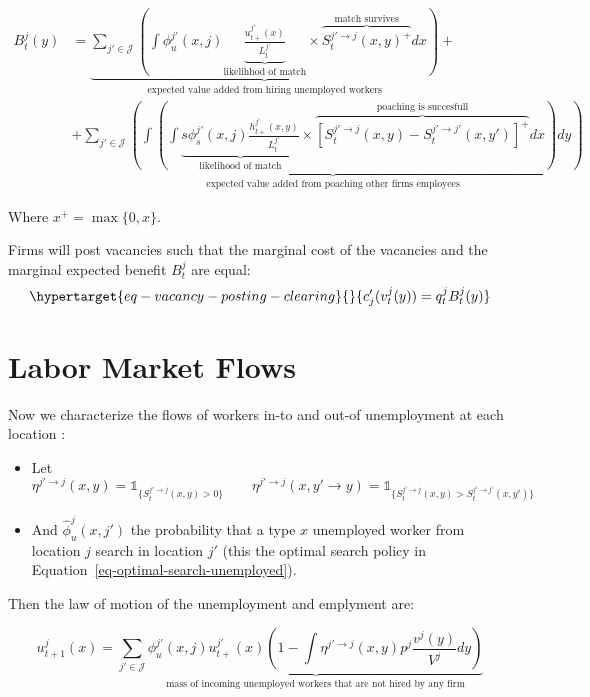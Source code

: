 \documentclass[
  letterpaper,
  DIV=11,
  numbers=noendperiod]{scrreprt}
\providecommand{\tightlist}{%
  \setlength{\itemsep}{0pt}\setlength{\parskip}{0pt}}\usepackage{longtable,booktabs,array}
\begin{document}
\begin{align}
B^j_t(y) &= \underbrace{\sum_{j'\in \mathcal{J}}\left( \int\phi_u^{j'}(x,j)\underbrace{\frac{u^{j'}_{t+}(x)}{L^{j'}_t}}_{\text{likelihhod of match}}\times\overbrace{  S_t^{j'\to j}(x,y)^{+} }^{\text{match survives}}dx\right)}_{\text{expected value added from hiring unemployed workers}} + \nonumber \\
& +\underbrace{\sum_{j'\in \mathcal{J}}\left(\int \left(\int\underbrace{s\phi_s^{j'}(x,j)\frac{h^{j'}_{t+}(x,y)}{L^{j'}_t}}_{\text{likelihood of match}}\times \overbrace{ [S^{j' \to j}_t(x,y)-S^{j' \to j'}_{t}(x,y')]^{+}}^{\text{poaching is succesfull}}dx\right)dy\right)}_{\text{expected value added from poaching other firms employees}}
\end{align}

Where \(x^+ = \max\{0,x\}\).

Firms will post vacancies such that the marginal cost of the vacancies
and the marginal expected benefit \(B^j_t\) are equal:
\begin{equation}\protect\hypertarget{eq-vacancy-posting-clearing}{}{c_{j}'(v^{j}_t(y))=q^{j}_{t}B^{j}_{t}(y)}\label{eq-vacancy-posting-clearing}\end{equation}

\hypertarget{labor-market-flows}{%
\section{Labor Market Flows}\label{labor-market-flows}}

Now we characterize the flows of workers in-to and out-of unemployment
at each location :

\begin{itemize}
\tightlist
\item
  Let
  \[\eta^{j' \to j}(x,y) = \mathbb{1}_{\{S_{t}^{j' \to j}(x,y)>0\}} \qquad \eta^{j' \to j}(x,y'\to y) = \mathbb{1}_{\{S^{j' \to j}_{t}(x,y) > S^{j' \to j'}_{t}(x,y')\}}\]
\item
  And \(\hat{\phi}^j_u(x,j')\) the probability that a type \(x\)
  unemployed worker from location \(j\) search in location \(j'\) (this
  the optimal search policy in
  Equation~\ref{eq-optimal-search-unemployed}).
\end{itemize}

Then the law of motion of the unemployment and emplyment are:

\begin{equation}
u^{j}_{t+1}(x) = \sum_{j'\in \mathcal{J}}\underbrace{\phi_u^{j'}(x,j) u^{j'}_{t+}(x)\left( 1 - \int \eta^{j'\to j}(x,y) p^j\frac{v^j(y)}{V^j}dy \right)}_{\text{mass of incoming unemployed workers that are not hired by any firm}}
\end{equation}
\end{document}
